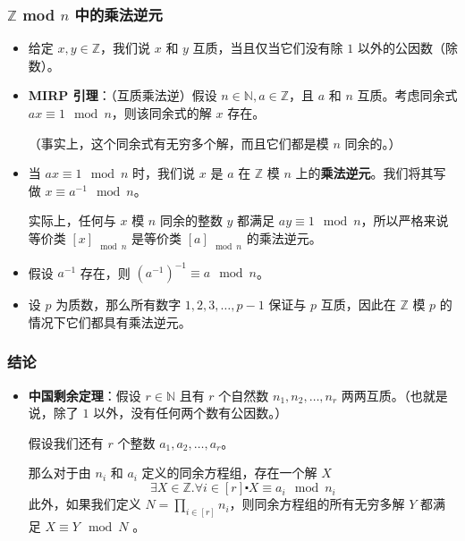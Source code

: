 \subsubsection{$\mathbb{Z}$ mod $n$ 中的乘法逆元}

\begin{itemize}
    \item 给定 $x,y \in \mathbb{Z}$，我们说 $x$ 和 $y$ 互质，当且仅当它们没有除 $1$ 以外的公因数（除数）。
    \item \textbf{MIRP 引理}：（互质乘法逆）假设 $n \in \mathbb{N}, a \in \mathbb{Z}$，且 $a$ 和 $n$ 互质。考虑同余式 $ax \equiv 1 \mod n$，则该同余式的解 $x$ 存在。

          （事实上，这个同余式有无穷多个解，而且它们都是模 $n$ 同余的。）
    \item 当 $ax \equiv  1 \mod n$ 时，我们说 $x$ 是 $a$ 在 $\mathbb{Z}$ 模 $n$ 上的\textbf{乘法逆元}。我们将其写做 $x \equiv a^{-1} \mod n$。

          实际上，任何与 $x$ 模 $n$ 同余的整数 $y$ 都满足 $ay \equiv 1 \mod n$，所以严格来说等价类 $[x]_{\mod n}$ 是等价类 $[a]_{\mod n}$ 的乘法逆元。
    \item 假设 $a^{-1}$ 存在，则 $(a^{-1})^{-1} \equiv a \mod n$。
    \item 设 $p$ 为质数，那么所有数字 $1, 2, 3, \dots, p-1$ 保证与 $p$ 互质，因此在 $\mathbb{Z}$ 模 $p$ 的情况下它们都具有乘法逆元。
\end{itemize}

\subsubsection{结论}

\begin{itemize}
    \item \textbf{中国剩余定理}：假设 $r \in \mathbb{N}$ 且有 $r$ 个自然数 $n_1, n_2, \dots , n_r$ 两两互质。（也就是说，除了 $1$ 以外，没有任何两个数有公因数。）

          假设我们还有 $r$ 个整数 $a_1, a_2, \dots , a_r$。

          那么对于由 $n_i$ 和 $a_i$ 定义的同余方程组，存在一个解 $X$
          \[\exists X \in \mathbb{Z}. \forall i \in [r] \centerdot X \equiv a_i \mod n_i\]
          此外，如果我们定义 $N = \prod_{i \in [r]}n_i$，则同余方程组的所有无穷多解 $Y$ 都满足 $X \equiv Y \mod N$ 。
\end{itemize}

